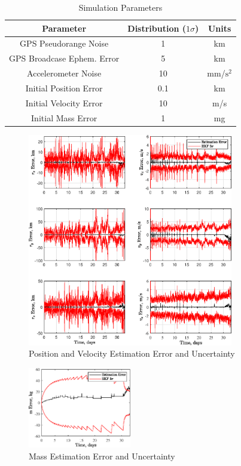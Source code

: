 \documentclass[letterpaper, submit]{AAS}			%
\begin{document}
\begin{table}[]
	\centering
	\caption{Simulation Parameters}
	\label{tab:sim_params}
	\begin{tabular}{ccc}
		\hline
		\hline
		Parameter             		 & Distribution ($1\sigma$) & Units \\ 
		\hline
		GPS Pseudorange Noise 		 & 1 		    & km            	\\
		GPS Broadcase Ephem. Error   & 5            & km  				\\
		Accelerometer Noise          & 10  			& mm/$\text{s}^2$  	\\ 
		\hline
		Initial Position Error       & 0.1  		& km             	\\
		Initial Velocity Error   	 & 10      		& m/s          		\\
		Initial Mass Error 			 & 1			& mg 				\\
		\hline \hline
	\end{tabular}
\end{table}

\begin{figure}[]
	\centering
	\includegraphics[width=0.8\textwidth]{./../../figures/EKFPosVelError.eps}
	\caption{Position and Velocity Estimation Error and Uncertainty}
	\label{fig:posvel_err}
\end{figure}
\begin{figure}[]
	\centering
	\includegraphics[width=0.4\textwidth]{./../../figures/EKFMass.eps}
	\caption{Mass Estimation Error and Uncertainty}
	\label{fig:mass_err}
\end{figure}


\end{document}
